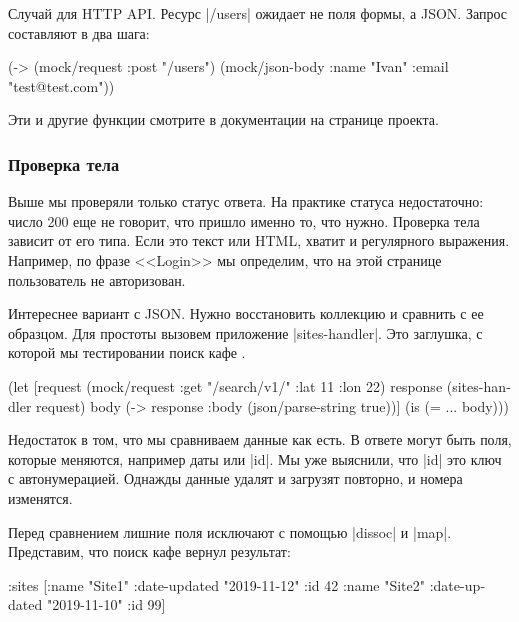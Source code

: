 Случай для HTTP API. Ресурс \spverb|/users| ожидает не поля формы, а
JSON. Запрос составляют в два шага:

\begin{english}
  \begin{clojure}
(-> (mock/request :post "/users")
    (mock/json-body {:name "Ivan" :email "test@test.com"}))
  \end{clojure}
\end{english}

Эти и другие функции смотрите в документации на странице проекта.

\subsubsection*{Проверка тела}

Выше мы проверяли только статус ответа. На практике статуса недостаточно: число
200 еще не говорит, что пришло именно то, что нужно. Проверка тела зависит от
его типа. Если это текст или HTML, хватит и регулярного выражения. Например, по
фразе <<Login>> мы определим, что на этой странице пользователь не авторизован.

Интереснее вариант с JSON. Нужно восстановить коллекцию и сравнить с ее
образцом. Для простоты вызовем приложение \spverb|sites-handler|. Это заглушка,
с которой мы тестировании поиск кафе .

\begin{english}
  \begin{clojure}
(let [request (mock/request :get "/search/v1/" {:lat 11 :lon 22})
      response (sites-handler request)
      body (-> response :body (json/parse-string true))]
  (is (= {...} body)))
  \end{clojure}
\end{english}

Недостаток в том, что мы сравниваем данные как есть. В ответе могут быть поля,
которые меняются, например даты или \spverb|id|. Мы уже выяснили, что
\spverb|id| это ключ с автонумерацией. Однажды данные удалят и загрузят
повторно, и номера изменятся.

Перед сравнением лишние поля исключают с помощью \spverb|dissoc| и
\spverb|map|. Представим, что поиск кафе вернул результат:

\begin{english}
  \begin{clojure}
{:sites [{:name "Site1" :date-updated "2019-11-12" :id 42}
         {:name "Site2" :date-updated "2019-11-10" :id 99}]}
  \end{clojure}
\end{english}

